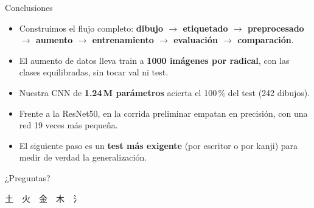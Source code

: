 \documentclass[aspectratio=169,11pt]{beamer}
\newcommand{\jp}[1]{{\cjkfont #1}}
\begin{document}
\begin{frame}{Conclusiones}
  \begin{itemize}
    \item Construimos el flujo completo: \textbf{dibujo $\to$ etiquetado $\to$ preprocesado $\to$ aumento $\to$ entrenamiento $\to$ evaluación $\to$ comparación}.
    \item El aumento de datos lleva train a \textbf{1000 imágenes por radical}, con las clases equilibradas, sin tocar val ni test.
    \item Nuestra CNN de \textbf{1.24\,M parámetros} acierta el 100\,\% del test (242 dibujos).
    \item Frente a la ResNet50, en la corrida preliminar empatan en precisión, con una red 19 veces más pequeña.
    \item El siguiente paso es un \textbf{test más exigente} (por escritor o por kanji) para medir de verdad la generalización.
  \end{itemize}
\end{frame}

\begin{frame}[standout]
  ¿Preguntas?

  \bigskip
  \jp{\Huge 土　火　金　木　氵}
\end{frame}
\end{document}
